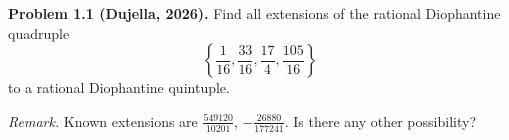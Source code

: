 \textbf{Problem 1.1 (Dujella, 2026).} Find all extensions of the rational Diophantine quadruple
\[
\left\{ \frac{1}{16}, \frac{33}{16}, \frac{17}{4}, \frac{105}{16} \right\}
\]
to a rational Diophantine quintuple.

\medskip

\textit{Remark.} Known extensions are $\frac{549120}{10201}$, $-\frac{26880}{177241}$. Is there any other possibility?
